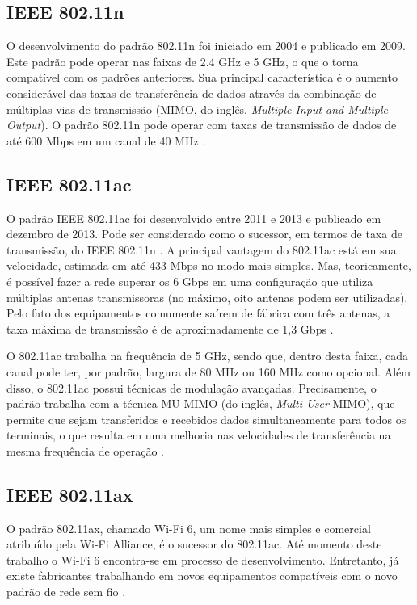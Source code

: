 \subsection{IEEE 802.11n}
\label{subsec:802-11n}

O desenvolvimento do padrão 802.11n foi iniciado em 2004 e publicado em 2009. Este padrão pode operar nas faixas de 2.4 GHz e 5 GHz, o que o torna compatível com os padrões anteriores. Sua principal característica é o aumento considerável das taxas de transferência de dados através da combinação de múltiplas vias de transmissão (MIMO, do inglês, \textit{Multiple-Input and Multiple-Output}). O padrão 802.11n pode operar com taxas de transmissão de dados de até 600 Mbps em um canal de 40 MHz \cite{moraes2010}.

\subsection{IEEE 802.11ac}
\label{subsec:802-11ac}

O padrão IEEE 802.11ac foi desenvolvido entre 2011 e 2013 e publicado em dezembro de 2013. Pode ser considerado como o sucessor, em termos de taxa de transmissão, do IEEE 802.11n \cite{alecrim2008site}.
A principal vantagem do 802.11ac está em sua velocidade, estimada em até 433 Mbps no modo mais simples. Mas, teoricamente, é possível fazer a rede superar os 6 Gbps em uma configuração que utiliza múltiplas antenas transmissoras (no máximo, oito antenas podem ser utilizadas). Pelo fato dos equipamentos comumente saírem de fábrica com três antenas, a taxa máxima de transmissão é de aproximadamente de 1,3 Gbps \cite{alecrim2008site}.

O 802.11ac trabalha na frequência de 5 GHz, sendo que, dentro desta faixa, cada canal pode ter, por padrão, largura de 80 MHz ou 160 MHz como opcional. Além disso, o 802.11ac possui técnicas de modulação avançadas. Precisamente, o padrão trabalha com a técnica MU-MIMO (do inglês, \textit{Multi-User} MIMO), que permite que sejam transferidos e recebidos dados simultaneamente para todos os terminais, o que resulta em uma melhoria nas velocidades de transferência na mesma frequência de operação \cite{alecrim2008site}.

\subsection{IEEE 802.11ax}
\label{subsec:802-11ax}

O padrão 802.11ax, chamado Wi-Fi 6, um nome mais simples e comercial atribuído pela Wi-Fi Alliance, é o sucessor do 802.11ac. Até momento deste trabalho o Wi-Fi 6 encontra-se em processo de desenvolvimento. Entretanto, já existe fabricantes trabalhando em novos equipamentos compatíveis com o novo padrão de rede sem fio \cite{plaza2018site}.

